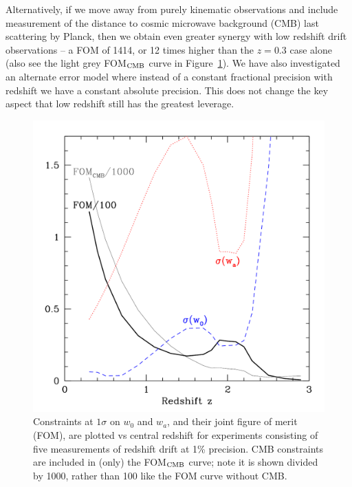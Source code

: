 \documentclass[preprint2, 10pt]{aastex}
\begin{document}
{Alternatively, if we move away from 
purely kinematic observations and include measurement of the distance to 
cosmic microwave background (CMB) last scattering by Planck, then we obtain 
even greater synergy with low redshift drift observations -- a FOM of 1414, 
or 12 times higher than the $z=0.3$ case alone (also see the light grey 
FOM$_{\rm CMB}$ curve in Figure~\ref{fig:fom}). 
We have also investigated an alternate error model where 
instead of a constant fractional precision with redshift we have a constant 
absolute precision. This does not change the key aspect that low 
redshift still has the greatest leverage. 


\begin{figure}[!htbp] 
   \centering
  \includegraphics[width=\columnwidth]{fomcmb.pdf}
\caption{Constraints at $1\sigma$ on $w_0$ and $w_a$, and their joint 
figure of merit (FOM), are plotted vs central redshift for experiments 
consisting of five measurements of redshift drift at 1\% precision. 
CMB constraints are included in (only) the FOM$_{\rm CMB}$ curve; 
note it is shown divided by 1000, rather than 100 like 
the FOM curve without CMB. 
} 
\label{fig:fom} 
\end{figure}


}
\end{document}
